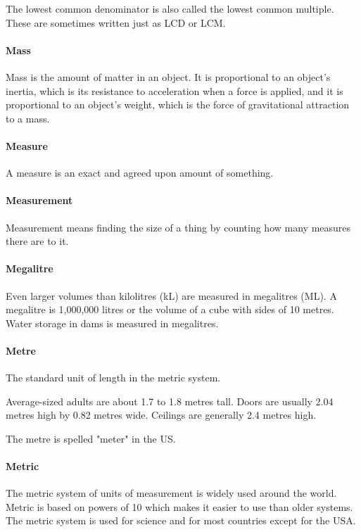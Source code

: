 \documentclass[12pt]{article}
\begin{document}
The lowest common denominator is also called the lowest common multiple. These are sometimes written just as LCD or LCM.\\

\paragraph{Mass}
Mass is the amount of matter in an object. It is proportional to an object's inertia, which is its resistance to acceleration when a force is applied, and it is proportional to an object's weight, which is the force of gravitational attraction to a mass.

\paragraph{Measure}
A measure is an exact and agreed upon amount of something.

\paragraph{Measurement}
Measurement means finding the size of a thing by counting how many measures there are to it.

\paragraph{Megalitre} Even larger volumes than kilolitres (kL) are measured in megalitres (ML). A megalitre is 1,000,000 litres or the volume of a cube with sides of 10 metres. Water storage in dams is measured in megalitres.

\paragraph{Metre} The standard unit of length in the metric system.

Average-sized adults are about 1.7 to 1.8 metres tall. Doors are usually 2.04 metres high by 0.82 metres wide. Ceilings are generally 2.4 metres high.

The metre is spelled "meter" in the US.

\paragraph{Metric}
The metric system of units of measurement is widely used around the world. Metric is based on powers of 10 which makes it easier to use than older systems. The metric system is used for science and for most countries except for the USA.
\end{document}
